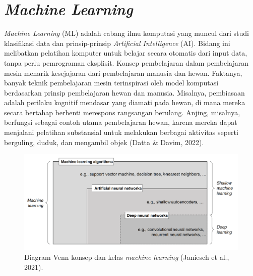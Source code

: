\section{\emph{Machine Learning}}
\label{sec:machinelearning}

\emph{Machine Learning} (ML) adalah cabang ilmu komputasi yang muncul dari studi klasifikasi data dan prinsip-prinsip \emph{Artificial Intelligence} (AI). Bidang ini melibatkan pelatihan komputer untuk belajar secara otomatis dari input data, tanpa perlu pemrograman eksplisit. Konsep pembelajaran dalam pembelajaran mesin menarik kesejajaran dari pembelajaran manusia dan hewan. Faktanya, banyak teknik pembelajaran mesin terinspirasi oleh model komputasi berdasarkan prinsip pembelajaran hewan dan manusia. Misalnya, pembiasaan adalah perilaku kognitif mendasar yang diamati pada hewan, di mana mereka secara bertahap berhenti merespons rangsangan berulang. Anjing, misalnya, berfungsi sebagai contoh utama pembelajaran hewan, karena mereka dapat menjalani pelatihan substansial untuk melakukan berbagai aktivitas seperti berguling, duduk, dan mengambil objek (Datta \& Davim, 2022).

\begin{figure}[H]
  \centering
  \includegraphics[scale=0.3]{gambar/machinelearning.png}
  \caption{Diagram Venn konsep dan kelas \emph{machine learning} (Janiesch et al., 2021).}
  \label{fig:machinelearningdiagram}
\end{figure}

